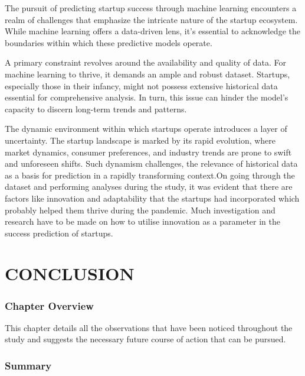 \documentclass[12pt]{article}
\begin{document}
The pursuit of predicting startup success through machine learning encounters a realm of challenges that emphasize the intricate nature of the startup ecosystem. While machine learning offers a data-driven lens, it's essential to acknowledge the boundaries within which these predictive models operate.

A primary constraint revolves around the availability and quality of data. For machine learning to thrive, it demands an ample and robust dataset. Startups, especially those in their infancy, might not possess extensive historical data essential for comprehensive analysis. In turn, this issue can hinder the model's capacity to discern long-term trends and patterns.

The dynamic environment within which startups operate introduces a layer of uncertainty. The startup landscape is marked by its rapid evolution, where market dynamics, consumer preferences, and industry trends are prone to swift and unforeseen shifts. Such dynamism challenges, the relevance of historical data as a basis for prediction in a rapidly transforming context.On going through the dataset and performing analyses during the study, it was evident that there are factors like innovation and adaptability that the startups had incorporated which probably helped them thrive during the pandemic. Much investigation and research have to be made on how to utilise innovation as a parameter in the success prediction of startups.

\newpage
\section{CONCLUSION}
\subsubsection{Chapter Overview}

This chapter details all the observations that have been noticed throughout the study and suggests the necessary future course of action that can be pursued.

\subsubsection{Summary}
\end{document}
